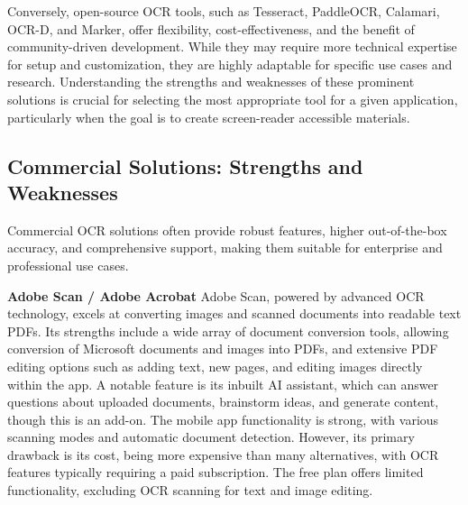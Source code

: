 Conversely, open-source OCR tools, such as Tesseract, PaddleOCR, Calamari, OCR-D, and Marker, offer flexibility, cost-effectiveness, and the benefit of community-driven development. While they may require more technical expertise for setup and customization, they are highly adaptable for specific use cases and research. Understanding the strengths and weaknesses of these prominent solutions is crucial for selecting the most appropriate tool for a given application, particularly when the goal is to create screen-reader accessible materials.

\subsection{Commercial Solutions: Strengths and Weaknesses}

Commercial OCR solutions often provide robust features, higher out-of-the-box accuracy, and comprehensive support, making them suitable for enterprise and professional use cases.

\textbf{Adobe Scan / Adobe Acrobat}
Adobe Scan, powered by advanced OCR technology, excels at converting images and scanned documents into readable text PDFs. Its strengths include a wide array of document conversion tools, allowing conversion of Microsoft documents and images into PDFs, and extensive PDF editing options such as adding text, new pages, and editing images directly within the app. A notable feature is its inbuilt AI assistant, which can answer questions about uploaded documents, brainstorm ideas, and generate content, though this is an add-on. The mobile app functionality is strong, with various scanning modes and automatic document detection. However, its primary drawback is its cost, being more expensive than many alternatives, with OCR features typically requiring a paid subscription. The free plan offers limited functionality, excluding OCR scanning for text and image editing.

